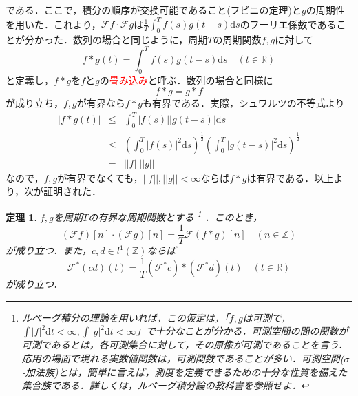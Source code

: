 \documentclass[a4j]{jsbook}
\newtheorem{theorem}{定理}
\numberwithin{theorem}{chapter}  %
\begin{document}
である．ここで，積分の順序が交換可能であること(フビニの定理)と\(g\)の周期性を用いた．これより，\(\mathcal{F}f\cdot\mathcal{F}g\)は\(\displaystyle\frac{1}{T}\int_0^T f(s)g(t-s)\mathrm{d}s\)のフーリエ係数であることが分かった．数列の場合と同じように，周期\(T\)の周期関数\(f, g\)に対して
\begin{equation*}
    f*g(t)=\int_0^T f(s)g(t-s)\mathrm{d}s\quad (t\in\mathbb{R})
\end{equation*}
と定義し，\(f*g\)を\(f\)と\(g\)の\textcolor{red}{畳み込み}と呼ぶ．数列の場合と同様に
\begin{equation*}
    f*g=g*f
\end{equation*}
が成り立ち，\(f, g\)が有界なら\(f*g\)も有界である．実際，シュワルツの不等式より
\begin{eqnarray*}
|f*g(t)|&\leq&\int_0^T |f(s)||g(t-s)|\mathrm{d}s \\
&\leq&\left(\int_0^T |f(s)|^2\mathrm{d}s\right)^{\frac{1}{2}}\left(\int_0^T |g(t-s)|^2\mathrm{d}s\right)^{\frac{1}{2}} \\
&=&||f||||g||
\end{eqnarray*}
なので，\(f, g\)が有界でなくても，\(||f||, ||g||<\infty\)ならば\(f*g\)は有界である．以上より，次が証明された．
\begin{theorem}
\label{th2-12}
\(f, g\)を周期\(T\)の有界な周期関数とする
\footnote{ルベーグ積分の理論を用いれば，この仮定は，「\(f, g\)は可測で，\(\displaystyle\int|f|^2\mathrm{d}t<\infty, \int|g|^2\mathrm{d}t<\infty\)」で十分なことが分かる．可測空間の間の関数が可測であるとは，各可測集合に対して，その原像が可測であることを言う．応用の場面で現れる実数値関数は，可測関数であることが多い．可測空間(\(\sigma\)-加法族)とは，簡単に言えば，測度を定義できるための十分な性質を備えた集合族である．詳しくは，ルベーグ積分論の教科書を参照せよ．}
．このとき，
\begin{equation*}
    (\mathcal{F}f)[n]\cdot(\mathcal{F}g)[n]=\frac{1}{T}\mathcal{F}(f*g)[n]\quad (n\in\mathbb{Z})
\end{equation*}
が成り立つ．また，\(c, d\in l^1(\mathbb{Z})\)ならば
\begin{equation*}
    \mathcal{F}^*(cd)(t)=\frac{1}{T}(\mathcal{F}^* c)*(\mathcal{F}^* d)(t)\quad (t\in\mathbb{R})
\end{equation*}
が成り立つ．
\end{theorem}
\end{document}
